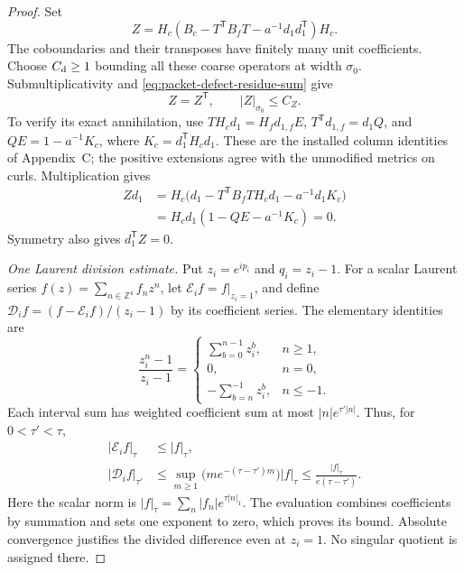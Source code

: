 \documentclass[11pt,reqno]{amsart}
\numberwithin{equation}{section}
\theoremstyle{definition}
\theoremstyle{remark}
\newcommand{\Z}{\mathbb Z}
\begin{document}
\begin{proof}
Set
\[
             Z=H_c(B_c-T^{\mathsf T}B_fT-a^{-1}d_1d_1^{\mathsf T})H_c.
\]
The coboundaries and their transposes have finitely many unit
coefficients. Choose \(C_{\rm d}\ge1\) bounding all these
coarse operators at width \(\sigma_0\). Submultiplicativity
and \eqref{eq:packet-defect-residue-sum} give
\begin{equation}
                 Z=Z^{\mathsf T},\qquad |Z|_{\sigma_0}\le C_Z.
 \label{eq:packet-unmodified-defect-bound}
\end{equation}
To verify its exact annihilation, use
\(TH_cd_1=H_fd_{1,f}E\),
\(T^{\mathsf T}d_{1,f}=d_1Q\), and
\(QE=1-a^{-1}K_c\), where \(K_c=d_1^{\mathsf T}H_cd_1\).
These are the installed column identities of Appendix~C;
the positive extensions agree with the unmodified metrics
on curls. Multiplication gives
\begin{equation}
 \begin{split}
 Zd_1
 &=H_c\bigl(d_1-T^{\mathsf T}B_fTH_cd_1-a^{-1}d_1K_c\bigr)\\
 &=H_cd_1(1-QE-a^{-1}K_c)=0.
 \end{split}
 \label{eq:packet-defect-annihilation}
\end{equation}
Symmetry also gives \(d_1^{\mathsf T}Z=0\).

\smallskip\noindent
\emph{One Laurent division estimate.}
Put \(z_i=e^{ip_i}\) and \(q_i=z_i-1\). For a scalar Laurent
series \(f(z)=\sum_{n\in\Z^4}f_nz^n\), let
\(\mathcal E_i f=f|_{z_i=1}\), and define
\(\mathcal D_i f=(f-\mathcal E_i f)/(z_i-1)\) by its
coefficient series. The elementary identities are
\[
 \frac{z_i^n-1}{z_i-1}=
 \begin{cases}
   \displaystyle\sum_{b=0}^{n-1}z_i^b,&n\ge1,\\[2pt]
   0,&n=0,\\[2pt]
   \displaystyle-\sum_{b=n}^{-1}z_i^b,&n\le-1.
 \end{cases}
\]
Each interval sum has weighted coefficient sum at most
\(|n|e^{\tau'|n|}\). Thus, for \(0<\tau'<\tau\),
\begin{equation}
 \begin{split}
 |\mathcal E_i f|_\tau&\le |f|_\tau,\\
 |\mathcal D_i f|_{\tau'}
 &\le\sup_{m\ge1}\bigl(m e^{-(\tau-\tau')m}\bigr)|f|_\tau
 \le\frac{|f|_\tau}{e(\tau-\tau')}.
 \end{split}
 \label{eq:packet-laurent-width-loss}
\end{equation}
Here the scalar norm is
\(|f|_\tau=\sum_n|f_n|e^{\tau|n|_1}\).
The evaluation combines coefficients by summation and sets
one exponent to zero, which proves its bound. Absolute
convergence justifies the divided difference even at
\(z_i=1\). No singular quotient is assigned there.


\end{proof}
\end{document}
